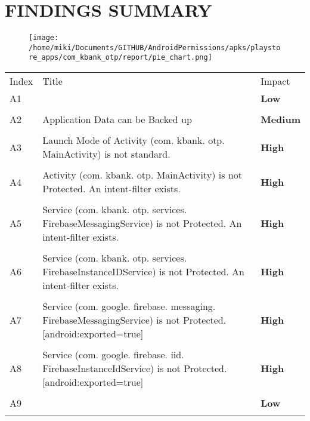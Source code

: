 \documentclass[12p]{article}
\begin{document}
\section{FINDINGS SUMMARY}\label{sec:summary}
\begin{figure}[H]
\centering
	\texttt{[image: /home/miki/Documents/GITHUB/AndroidPermissions/apks/playstore\_apps/com\_kbank\_otp/report/pie\_chart.png]}
\end{figure}
	\begin{longtable}{p{0.5cm} p{10cm} p{1.5cm}}
	\rowcolor{grannysmithapple!70} Index & Title & Impact \\
	A1&& \color{amber}\textbf{Low} \\
\hline\\	A2&Application Data can be Backed up& \color{orange(colorwheel)}\textbf{Medium} \\
\hline\\	A3&Launch Mode of Activity \newline (com. kbank. otp. MainActivity) is not standard.& \color{ferrarired}\textbf{High} \\
\hline\\	A4&Activity \newline (com. kbank. otp. MainActivity) is not Protected. An intent-filter exists.& \color{ferrarired}\textbf{High} \\
\hline\\	A5&Service \newline (com. kbank. otp. services. FirebaseMessagingService) is not Protected. An intent-filter exists.& \color{ferrarired}\textbf{High} \\
\hline\\	A6&Service \newline (com. kbank. otp. services. FirebaseInstanceIDService) is not Protected. An intent-filter exists.& \color{ferrarired}\textbf{High} \\
\hline\\	A7&Service \newline (com. google. firebase. messaging. FirebaseMessagingService) is not Protected. [android:exported=true]& \color{ferrarired}\textbf{High} \\
\hline\\	A8&Service \newline (com. google. firebase. iid. FirebaseInstanceIdService) is not Protected. [android:exported=true]& \color{ferrarired}\textbf{High} \\
\hline\\	A9&& \color{amber}\textbf{Low} \\
\hline\\	\end{longtable}
\cleardoublepage
\newpage
\end{document}
